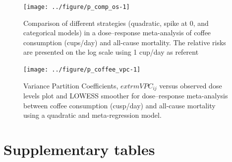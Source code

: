 \documentclass[11pt,a4paper,twoside,openany]{book}\usepackage{knitr}
\begin{document}
{\begin{knitrout}
\end{knitrout}

\begin{knitrout}\footnotesize
{}\color{fgcolor}\begin{figure}[ht!]

{\centering \texttt{[image: ../figure/p\_comp\_os-1]} 

}

\caption[Comparison of different strategies (quadratic, spike at 0, and categorical models) in a dose--response meta-analysis of coffee consumption (cups/day) and all-cause mortality]{Comparison of different strategies (quadratic, spike at 0, and categorical models) in a dose--response meta-analysis of coffee consumption (cups/day) and all-cause mortality. The relative risks are presented on the log scale using 1 cup/day as referent}\label{fig:p_comp_os}
\end{figure}


\end{knitrout}

\begin{knitrout}\footnotesize
{}\color{fgcolor}\begin{figure}[ht!]

{\centering \texttt{[image: ../figure/p\_coffee\_vpc-1]} 

}

\caption[Variance Partition Coefficients, $	extrm{VPC}_{ij}$ versus observed dose levels plot and LOWESS smoother for dose--response meta-analysis between coffee consumption (cusp/day) and all-cause mortality using a quadratic and meta-regression model]{Variance Partition Coefficients, $	extrm{VPC}_{ij}$ versus observed dose levels plot and LOWESS smoother for dose--response meta-analysis between coffee consumption (cusp/day) and all-cause mortality using a quadratic and meta-regression model.}\label{fig:p_coffee_vpc}
\end{figure}


\end{knitrout}



\chapter{Supplementary tables}

\begin{knitrout}\footnotesize
{}\color{fgcolor}\begin{table}[!h]


\end{table}
\end{knitrout}}
\end{document}
